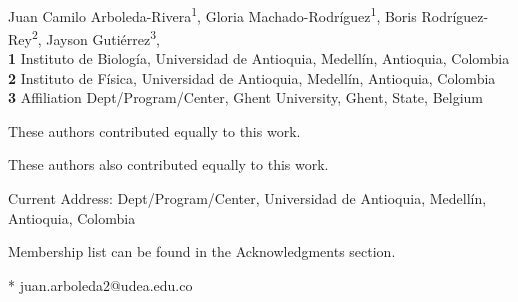 \documentclass[10pt,letterpaper]{article}
\date{}
\begin{document}
\vspace*{0.2in}

\begin{flushleft}
{\Large
\textbf{} %
}
\newline
\\
Juan Camilo Arboleda-Rivera\textsuperscript{1\Yinyang},
Gloria Machado-Rodríguez\textsuperscript{1\Yinyang},
Boris Rodríguez-Rey\textsuperscript{2\textcurrency},
Jayson Gutiérrez\textsuperscript{3},
\\
\bigskip
\textbf{1} Instituto de Biología, Universidad de Antioquia, Medellín, Antioquia, Colombia
\\
\textbf{2} Instituto de Física, Universidad de Antioquia, Medellín, Antioquia, Colombia
\\
\textbf{3} Affiliation Dept/Program/Center, Ghent University, Ghent, State, Belgium
\\
\bigskip

% 
%
\Yinyang These authors contributed equally to this work.

\ddag These authors also contributed equally to this work.

\textcurrency Current Address: Dept/Program/Center, Universidad de Antioquia, 
Medellín, Antioquia, Colombia %


\textpilcrow Membership list can be found in the Acknowledgments section.

* juan.arboleda2@udea.edu.co

\end{flushleft}
\end{document}
